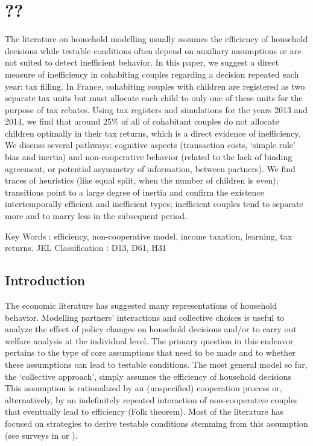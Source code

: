 
\ifx\isEmbedded\undefined


\setcounter{chapter}{3}
\chapter{\label{??} ??}
\else \fi
{}
The literature on household modelling usually assumes the efficiency of household decisions while testable conditions often depend on auxiliary assumptions or are not suited to detect inefficient behavior. In this paper, we suggest a direct measure of inefficiency in cohabiting couples regarding a decision repeated each year: tax filling. In France, cohabiting couples with children are registered as two separate tax units but must allocate each child to only one of these units for the purpose of tax rebates. Using tax registers and simulations for the years 2013 and 2014, we find that around 25\% of all of cohabitant couples do not allocate children optimally in their tax returns, which is a direct evidence of inefficiency. We discuss several pathways: cognitive aspects (transaction costs, `simple rule’ bias and inertia) and non-cooperative behavior (related to the lack of binding agreement, or potential asymmetry of information, between partners). We find traces of heuristics (like equal split, when the number of children is even); transitions point to a large degree of inertia and confirm the existence intertemporally efficient and inefficient types; inefficient couples tend to separate more and to marry less in the subsequent period.
\medskip



Key Words : efficiency, non-cooperative model, income taxation, learning, tax returns.
JEL Classification : D13, D61, H31
\section{Introduction}
The economic literature has suggested many representations of household behavior. Modelling partners’ interactions and collective choices is useful to analyze the effect of policy changes on household decisions and/or to carry out welfare analysis at the individual level. The primary question in this endeavor pertains to the type of core assumptions that need to be made and to whether these assumptions can lead to testable conditions. The most general model so far, the ‘collective approach’, simply assumes the efficiency of household decisions \citep{chiappori1988rational} This assumption is rationalized by an (unspecified) cooperation process or, alternatively, by an indefinitely repeated interaction of non-cooperative couples that eventually lead to efficiency (Folk theorem). Most of the literature has focused on strategies to derive testable conditions stemming from this assumption (see surveys in \citet{vermeulen2002collective} or \citet{donni2011nonunitary}). 


